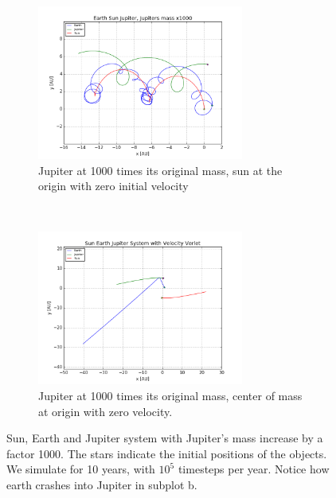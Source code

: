 \documentclass[a4paper, 10pt]{article}
\begin{document}
\begin{figure}[t!]
    \centering
    \begin{subfigure}[t]{0.5\textwidth}
        \centering
        \includegraphics[height=2.0in]{orbitESJ1000.png}
        \caption{Jupiter at 1000 times its original mass, sun at the origin with zero initial velocity}
    \end{subfigure}%
    ~ 
    \begin{subfigure}[t]{0.5\textwidth}
        \centering
        \includegraphics[height=2.0in]{orbitSEJMCAtOri.png}
        \caption{Jupiter at 1000 times its original mass, center of mass at origin with zero velocity.}
    \end{subfigure}
    \caption{Sun, Earth and Jupiter system with Jupiter's mass increase by a factor 1000. The stars indicate the initial positions of the objects. We simulate for 10 years, with $10^5$ timesteps per year. Notice how earth crashes into Jupiter in subplot b.}
\end{figure} \label{fig:Jupiter1000}
\end{document}
